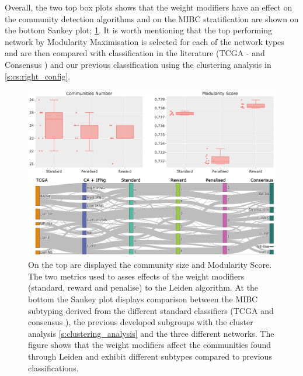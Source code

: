 Overall, the two top box plots shows that the weight modifiers have an effect on the community detection algorithms and on the MIBC stratification are shown on the bottom Sankey plot; \cref{fig:N_I:tum_leiden_modifiers}. It is worth mentioning that the top performing network by Modularity Maximisation is selected for each of the network types and are then compared with classification in the literature (TCGA - \citep{Robertson2017-mg} and Consensus \citep{Kamoun2020-tj}) and our previous classification using the clustering analysis in \cref{s:cs:right_config}. 


\begin{figure}[!t]    
    \centering
    \includegraphics[width=1.0\textwidth,keepaspectratio]{Sections/Network_I/Resources/Tum_network/LeidenMetrics_Sankey_TF-6.png}
    \caption[Tum: Leiden metrics]{On the top are displayed the community size and Modularity Score. The two metrics used to asses effects of the weight modifiers (standard, reward and penalise) to the Leiden algorithm. At the bottom the Sankey plot displays comparison between the MIBC subtyping derived from the different standard classifiers (TCGA \citep{Robertson2017-mg} and consensus \citep{Kamoun2020-tj}), the previous developed subgroups with the cluster analysis \cref{s:clustering_analysis} and the three different networks. The figure shows that the weight modifiers affect the communities found through Leiden and exhibit different subtypes compared to previous classifications.}
    \label{fig:N_I:tum_leiden_modifiers}
\end{figure}

